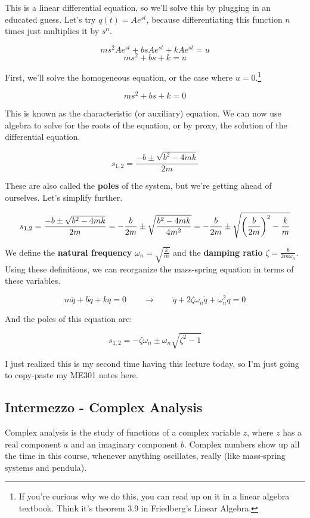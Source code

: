 \documentclass{article}
\begin{document}
\begin{onehalfspacing}
\begin{flushleft}
This is a linear differential equation, so we'll solve this by plugging in an educated guess. Let's try \(q(t) = Ae^{st}\), because differentiating this function \(n\) times just multiplies it by \(s^n\).

\vspace{-0.1in}
\[ms^2 Ae^{st} + bs Ae^{st} + kAe^{st} = u\]
\[ms^2 + bs + k = u\]

First, we'll solve the homogeneous equation, or the case where \(u=0\).\footnote{If you're curious why we do this, you can read up on it in a linear algebra textbook. Think it's theorem 3.9 in Friedberg's Linear Algebra.}

\[ms^2 + bs + k = 0\]

This is known as the characteristic (or auxiliary) equation. We can now use algebra to solve for the roots of the equation, or by proxy, the solution of the differential equation.

\[s_{1, 2} = \frac{-b \pm \sqrt{b^2 - 4mk}}{2m}\]

These are also called the \textbf{poles} of the system, but we're getting ahead of ourselves. Let's simplify further.

\[s_{1, 2} = \frac{-b \pm \sqrt{b^2 - 4mk}}{2m} = -\frac{b}{2m} \pm \sqrt{\frac{b^2 - 4mk}{4m^2}} = -\frac{b}{2m} \pm \sqrt{\qty(\frac{b}{2m})^2 - \frac{k}{m}}\]

We define the \textbf{natural frequency} \(\omega_n = \sqrt{\frac{k}{m}}\) and the \textbf{damping ratio} \(\zeta = \frac{b}{2m\omega_n}\). Using these definitions, we can reorganize the mass-spring equation in terms of these variables.

\vspace{-0.1in}
\[m\ddot{q} + b\dot{q} + kq = 0 \qquad \to \qquad \ddot{q} + 2\zeta\omega_n \dot{q} + \omega_n^2 q = 0\]

And the poles of this equation are:

\[s_{1, 2} = -\zeta \omega_n \pm \omega_n \sqrt{\zeta^2 - 1}\]

I just realized this is my second time having this lecture today, so I'm just going to copy-paste my ME301 notes here.

\subsection{Intermezzo - Complex Analysis}

Complex analysis is the study of functions of a complex variable \(z\), where \(z\) has a real component \(a\) and an imaginary component \(b\). Complex numbers show up all the time in this course, whenever anything oscillates, really (like mass-spring systems and pendula).


\end{flushleft}
\end{onehalfspacing}
\end{document}

